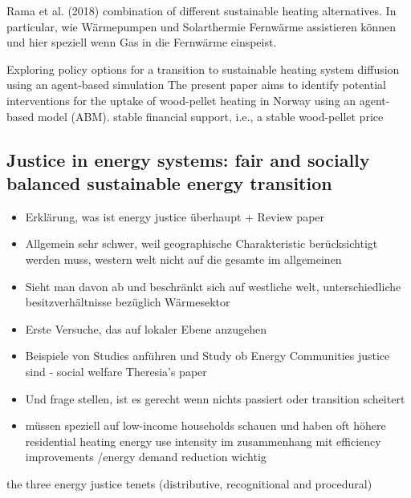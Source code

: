 Rama et al. (2018) \cite{rama2018introduction} combination of different sustainable heating alternatives. In particular, wie Wärmepumpen und Solarthermie Fernwärme assistieren können und hier speziell wenn Gas in die Fernwärme einspeist. 


Exploring policy options for a transition to sustainable heating system diffusion using an agent-based simulation
The present paper aims to identify potential interventions for the uptake of wood-pellet heating in Norway using an agent-based model (ABM).
stable financial support, i.e., a stable wood-pellet price \cite{sopha2011exploring}



\subsection{Justice in energy systems: fair and socially balanced sustainable energy transition}
\begin{itemize}
	\item[\textcolor{col}{\textbullet}] \textcolor{col}{Erklärung, was ist energy justice überhaupt + Review paper}
	\item[\textcolor{col}{\textbullet}] \textcolor{col}{Allgemein sehr schwer, weil geographische Charakteristic berücksichtigt werden muss, western welt nicht auf die gesamte im allgemeinen}
	\item[\textcolor{col}{\textbullet}] \textcolor{col}{Sieht man davon ab und beschränkt sich auf westliche welt, unterschiedliche besitzverhältnisse bezüglich Wärmesektor}	
	\item[\textcolor{col}{\textbullet}] \textcolor{col}{Erste Versuche, das auf lokaler Ebene anzugehen}
	\item[\textcolor{col}{\textbullet}] \textcolor{col}{Beispiele von Studies anführen und Study ob Energy Communities justice sind - social welfare Theresia's paper}
	\item[\textcolor{col}{\textbullet}] \textcolor{col}{Und frage stellen, ist es gerecht wenn nichts passiert oder transition scheitert}
	\item[\textcolor{col}{\textbullet}] \textcolor{col}{müssen speziell auf low-income households schauen und haben oft höhere residential heating energy use intensity im zusammenhang mit efficiency improvements /energy demand reduction wichtig}
\end{itemize}


the three energy justice tenets (distributive, recognitional and procedural)


